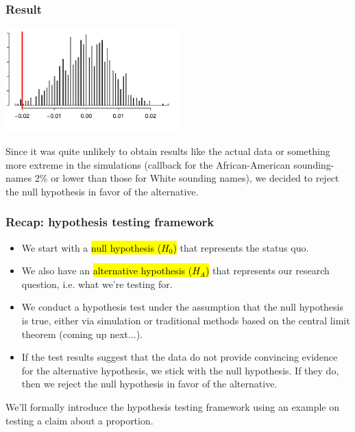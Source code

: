 \documentclass[notes,11pt, aspectratio=169]{beamer}
\begin{document}
\begin{frame}
\frametitle{Result}

\begin{center}
\includegraphics[width=0.5\textwidth]{graphs/l05f05}
\end{center}

\pause

Since it was quite unlikely to obtain results like the actual data or something more extreme in the simulations (callback for the African-American sounding-names 2\% or lower than those for White sounding names), we decided to reject the null hypothesis in favor of the alternative.

\end{frame}


\begin{frame}
\frametitle{Recap: hypothesis testing framework}

\begin{itemize}
\item We start with a \hl{null hypothesis ($H_0$)} that represents the status quo.
\pause
\item We also have an \hl{alternative hypothesis ($H_A$)} that represents our research question, i.e. what we're testing for.
\pause
\item We conduct a hypothesis test under the assumption that the null hypothesis is true, either via simulation or traditional methods based on the central limit theorem (coming up next...).
\pause
\item If the test results suggest that the data do not provide convincing evidence for the alternative hypothesis, we stick with the null hypothesis. If they do, then we reject the null hypothesis in favor of the alternative.
\end{itemize}
\pause
We'll formally introduce the hypothesis testing framework using an example on testing a claim about a proportion.

\end{frame}

 
\end{document}
